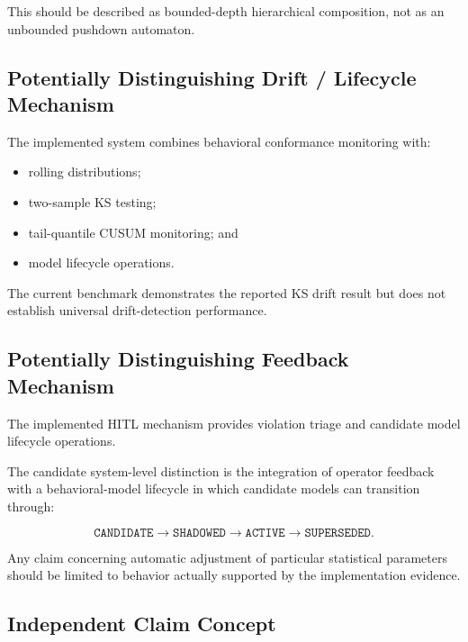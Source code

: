 \documentclass[11pt,a4paper]{article}
\begin{document}
This should be described as bounded-depth hierarchical composition, not as an unbounded
pushdown automaton.

\subsection{Potentially Distinguishing Drift / Lifecycle Mechanism}

The implemented system combines behavioral conformance monitoring with:

\begin{itemize}
\item rolling distributions;
\item two-sample KS testing;
\item tail-quantile CUSUM monitoring; and
\item model lifecycle operations.
\end{itemize}

The current benchmark demonstrates the reported KS drift result but does not establish
universal drift-detection performance.

\subsection{Potentially Distinguishing Feedback Mechanism}

The implemented HITL mechanism provides violation triage and candidate model lifecycle
operations.

The candidate system-level distinction is the integration of operator feedback with a
behavioral-model lifecycle in which candidate models can transition through:

\[
\texttt{CANDIDATE}
\rightarrow
\texttt{SHADOWED}
\rightarrow
\texttt{ACTIVE}
\rightarrow
\texttt{SUPERSEDED}.
\]

Any claim concerning automatic adjustment of particular statistical parameters should
be limited to behavior actually supported by the implementation evidence.

\subsection{Independent Claim Concept}
\end{document}

